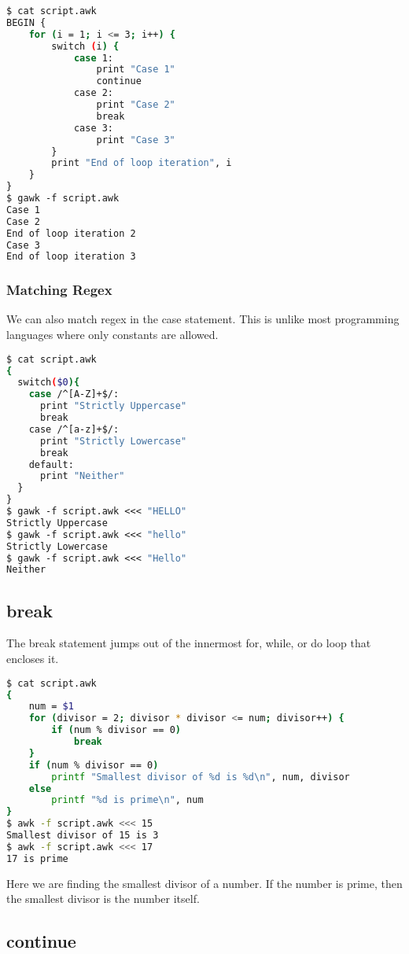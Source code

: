 \begin{lstlisting}[language=bash]
$ cat script.awk
BEGIN {
    for (i = 1; i <= 3; i++) {
        switch (i) {
            case 1:
                print "Case 1"
                continue
            case 2:
                print "Case 2"
                break
            case 3:
                print "Case 3"
        }
        print "End of loop iteration", i
    }
}
$ gawk -f script.awk
Case 1
Case 2
End of loop iteration 2
Case 3
End of loop iteration 3
\end{lstlisting}

\subsubsection{Matching Regex}

We can also match regex in the case statement. This is unlike most programming languages where only constants are allowed.

\begin{lstlisting}[language=bash]
$ cat script.awk
{
  switch($0){
    case /^[A-Z]+$/:
      print "Strictly Uppercase"
      break
    case /^[a-z]+$/:
      print "Strictly Lowercase"
      break
    default:
      print "Neither"
  }
}
$ gawk -f script.awk <<< "HELLO"
Strictly Uppercase
$ gawk -f script.awk <<< "hello"
Strictly Lowercase
$ gawk -f script.awk <<< "Hello"
Neither
\end{lstlisting}


\subsection{break}

The break statement jumps out of the innermost for, while, or do loop that encloses it.

\begin{lstlisting}[language=bash]
$ cat script.awk
{
    num = $1
    for (divisor = 2; divisor * divisor <= num; divisor++) {
        if (num % divisor == 0)
            break
    }
    if (num % divisor == 0)
        printf "Smallest divisor of %d is %d\n", num, divisor
    else
        printf "%d is prime\n", num
}
$ awk -f script.awk <<< 15
Smallest divisor of 15 is 3
$ awk -f script.awk <<< 17
17 is prime
\end{lstlisting}

Here we are finding the smallest divisor of a number. If the number is prime, then the smallest divisor is the number itself.

\subsection{continue}

